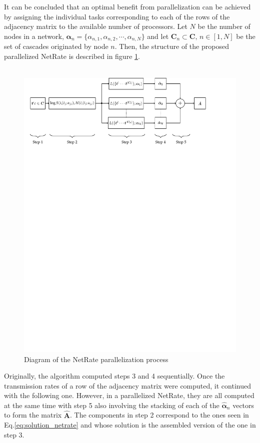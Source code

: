 It can be concluded that an optimal benefit from parallelization can be achieved by assigning the individual tasks corresponding to each of the rows of the adjacency matrix to the available number of processors. Let \(N\) be the number of nodes in a network, \(\bm{\alpha}_{n} = \{\alpha_{n,1},\alpha_{n,2},\cdots,\alpha_{n,N}\}\) and let \(\bm{C}_{n} \subset \bm{C}\text{, } n \in [1,N]\) be the set of cascades originated by node \(n\). Then, the structure of the proposed parallelized NetRate is described in figure \ref{fig:diagram_parallelization}.\\\\

\begin{figure}[H]
	\centering
	\includegraphics[trim={0 21cm 0 0}, width=\linewidth]{diagram_parallelization.pdf}
  \caption{Diagram of the NetRate parallelization process} 
	\label{fig:diagram_parallelization}
\end{figure}

Originally, the algorithm computed steps 3 and 4 sequentially. Once the transmission rates of a row of the adjacency matrix were computed, it continued with the following one. However, in a parallelized NetRate, they are all computed at the same time with step 5 also involving the stacking of each of the \(\bm{\hat{\alpha}}_{n}\) vectors to form the matrix \(\bm{\hat{A}}\).
The components in step 2 correspond to the ones seen in Eq.\ref{eq:solution_netrate} and whose solution is the assembled version of the one in step 3.\\


